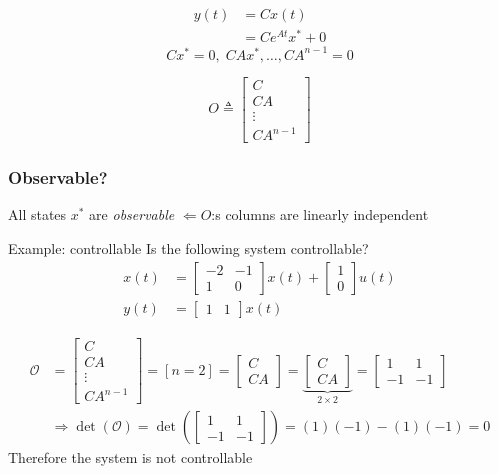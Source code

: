 \documentclass{article}
\begin{document}
\begin{align*}
    y(t) &= Cx(t) \\
    &= Ce^{At}x^* + 0
\end{align*}
\begin{equation*}
    Cx^* = 0, \; CAx^*, \ldots , CA^{n-1}=0
\end{equation*}

\begin{equation*}
    O \triangleq  \begin{bmatrix} C \\ CA \\ \vdots \\ CA^{n-1} \end{bmatrix}
\end{equation*}

\subsubsection{Observable?}
All states $x^*$ are \textit{observable} $\Leftarrow O$:s columns are linearly independent

\begin{exampleblock}{Example: controllable}
   Is the following system controllable?
   \begin{align*}
       x(t) &= \begin{bmatrix} -2 & -1 \\ 1 & 0 \end{bmatrix}x(t) 
       + \begin{bmatrix} 1 \\ 0 \end{bmatrix}u(t) \\ 
       y(t) &= \begin{bmatrix} 1 & 1 \end{bmatrix}x(t)
   \end{align*} 


   \begin{align*}
       \mathcal{O} &= \begin{bmatrix} C \\ CA \\ \vdots \\ CA^{n-1} \end{bmatrix} 
        = [n=2] = \begin{bmatrix} C \\ CA \end{bmatrix} 
        = \underbrace{\begin{bmatrix} C \\ CA \end{bmatrix}}_{2\times2} 
        = \begin{bmatrix} 1 & 1 \\ -1 & -1 \end{bmatrix} \\
        &\Rightarrow \det(\mathcal{O}) 
        =\det\left( \begin{bmatrix} 1 & 1 \\ -1 & -1 \end{bmatrix} \right) 
        = (1)(-1) -(1)(-1) = 0
   \end{align*}
   Therefore the system is not controllable
\end{exampleblock}
\end{document}
